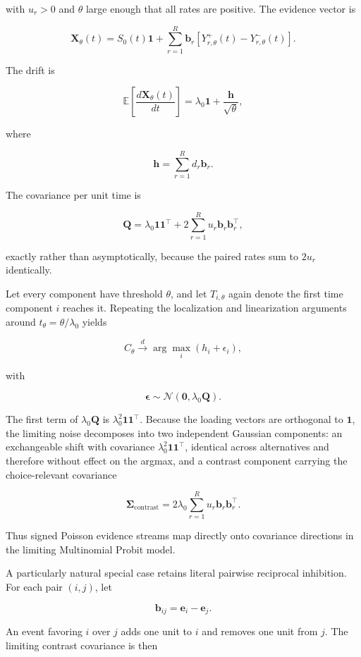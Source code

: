 \documentclass[
  man,
  floatsintext,
  longtable,
  a4paper,
  nolmodern,
  notxfonts,
  notimes,
  colorlinks=true,linkcolor=blue,citecolor=blue,urlcolor=blue]{apa7}
\begin{document}
with \(u_r>0\) and \(\theta\) large enough that all rates are positive.
The evidence vector is

\[
\mathbf X_\theta(t)
=
S_0(t)\mathbf 1
+
\sum_{r=1}^{R}
\mathbf b_r
\left[
Y_{r,\theta}^{+}(t)
-
Y_{r,\theta}^{-}(t)
\right].
\]

The drift is

\[
\mathbb E
\left[
\frac{d\mathbf X_\theta(t)}{dt}
\right]
=
\lambda_0\mathbf 1
+
\frac{\mathbf h}{\sqrt{\theta}},
\]

where

\[
\mathbf h
=
\sum_{r=1}^{R}d_r\mathbf b_r.
\]

The covariance per unit time is

\[
\mathbf Q
=
\lambda_0\mathbf 1\mathbf 1^\top
+
2\sum_{r=1}^{R}
u_r\mathbf b_r\mathbf b_r^\top,
\]

exactly rather than asymptotically, because the paired rates sum to
\(2u_r\) identically.

Let every component have threshold \(\theta\), and let \(T_{i,\theta}\)
again denote the first time component \(i\) reaches it. Repeating the
localization and linearization arguments around
\(t_\theta=\theta/\lambda_0\) yields

\[
C_\theta
\xrightarrow{d}
\arg\max_i
\left(
h_i+\epsilon_i
\right),
\]

with

\[
\boldsymbol\epsilon
\sim
\mathcal N(\mathbf 0,\lambda_0\mathbf Q).
\]

The first term of \(\lambda_0\mathbf Q\) is
\(\lambda_0^2\mathbf 1\mathbf 1^\top\). Because the loading vectors are
orthogonal to \(\mathbf 1\), the limiting noise decomposes into two
independent Gaussian components: an exchangeable shift with covariance
\(\lambda_0^2\mathbf 1\mathbf 1^\top\), identical across alternatives
and therefore without effect on the argmax, and a contrast component
carrying the choice-relevant covariance

\[
\boldsymbol\Sigma_{\mathrm{contrast}}
=
2\lambda_0
\sum_{r=1}^{R}
u_r\mathbf b_r\mathbf b_r^\top.
\]

Thus signed Poisson evidence streams map directly onto covariance
directions in the limiting Multinomial Probit model.

A particularly natural special case retains literal pairwise reciprocal
inhibition. For each pair \((i,j)\), let

\[
\mathbf b_{ij}
=
\mathbf e_i-\mathbf e_j.
\]

An event favoring \(i\) over \(j\) adds one unit to \(i\) and removes
one unit from \(j\). The limiting contrast covariance is then
\end{document}
